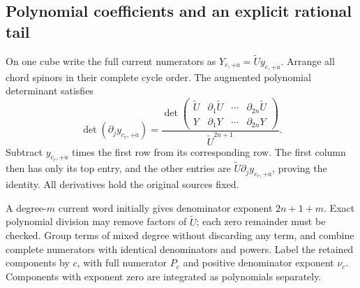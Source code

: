 \subsection{Polynomial coefficients and an explicit rational tail}
\label{networks:series}

On one cube write the full current numerators as
$Y_{e,+\dot a}=\widetilde U y_{e,+\dot a}$.
Arrange all chord spinors in their complete cycle order.  The augmented
polynomial determinant satisfies
\begin{equation}
 \boxed{
 \det(\partial_j y_{c_r,+\dot a})
 =\frac{\det\begin{pmatrix}
 \widetilde U&\partial_1\widetilde U&\cdots&\partial_{2n}\widetilde U\\
 Y&\partial_1Y&\cdots&\partial_{2n}Y
 \end{pmatrix}}{\widetilde U^{2n+1}}.}
 \label{networks:augmented}
\end{equation}
Subtract $y_{c_r,+\dot a}$ times the first row from its corresponding
row.  The first column then has only its top entry, and the other entries
are $\widetilde U\partial_jy_{c_r,+\dot a}$, proving the identity.
All derivatives hold the original sources fixed.

A degree-$m$ current word initially gives denominator exponent
$2n+1+m$.  Exact polynomial division may remove factors of
$\widetilde U$; each zero remainder must be checked.  Group terms of mixed
degree without discarding any term, and combine complete numerators with
identical denominators and powers.  Label the retained components by $c$,
with full numerator $P_c$ and positive denominator exponent $\nu_c$.
Components with exponent zero are integrated as polynomials separately.

